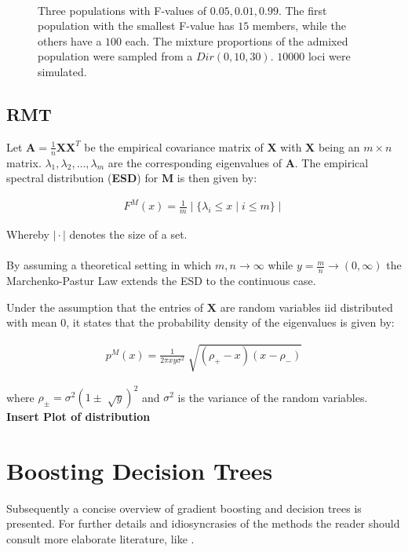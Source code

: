\documentclass[a4paper, 11pt]{article}
\begin{document}
\begin{figure}[h!]
\\Three populations with F-values  of $0.05, 0.01, 0.99$. The first population with the smallest F-value has $15$ members, while the others have a $100$ each. The mixture proportions of the admixed population were sampled from a $Dir(0, 10, 30)$. $10000$ loci were simulated.

\centering
\end{figure}


\newpage

\subsection{RMT}

Let $\mathbf{A} = \frac{1}{n}\mathbf{X}\mathbf{X}^{T}$ be the empirical covariance matrix of $\mathbf{X}$ with $\mathbf{X}$ being an $m \times n$ matrix. $\lambda_{1},\lambda_{2}, \dots, \lambda_{m}$ are the corresponding eigenvalues of $\mathbf{A}$. The empirical spectral distribution (\textbf{ESD}) for  $\mathbf{M}$ is then given by:

\begin{align*}
F^{M}(x) = \frac{1}{m} \mid \{\lambda_{i} \leq x \mid i \leq m\} \mid
\end{align*}

Whereby $\mid \cdot \mid$ denotes the size of a set.
\\
\\
By assuming a theoretical setting in which $m, n \rightarrow \infty$ while $y = \frac{m}{n} \rightarrow (0, \infty)$ the Marchenko-Pastur Law extends the ESD to the continuous case.

Under the assumption that the entries of $\mathbf{X}$ are random variables iid distributed with mean $0$, it states that the probability density of the eigenvalues is given by:

\begin{align*}
p^{M}(x) = \frac{1}{2\pi xy \sigma^{2}}  \sqrt[]{(\rho_{+} - x)(x - \rho_{-})}
\end{align*}

where $\rho_{\pm} = \sigma^{2}(1 \pm \sqrt[]{y})^{2}$ and $\sigma^2$ is the variance of the random variables.
\\
\textbf{Insert Plot of distribution}
\\

\newpage

\section{Boosting Decision Trees}
Subsequently a concise overview of gradient boosting and decision trees is presented. For further details and idiosyncrasies of the methods the reader should consult more elaborate literature, like \cite{trevor2009elements}.
\end{document}
